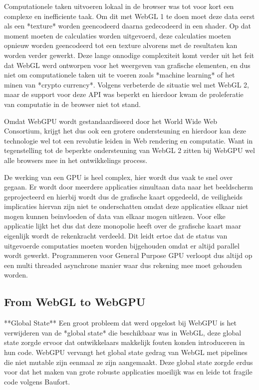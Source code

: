 Computationele taken uitvoeren lokaal in de browser was tot voor kort een complexe en inefficiente taak. Om dit met WebGL 1 te doen moet deze data eerst als een *texture* worden geencodeerd daarna gedecodeerd in een shader. Op dat moment moeten de calculaties worden uitgevoerd, deze calculaties moeten opnieuw worden geencodeerd tot een texture alvorens met de resultaten kan worden verder gewerkt. \textcite{Surma2022} Deze lange onnodige complexiteit komt verder uit het feit dat WebGL werd ontworpen voor het weergeven van grafische elementen, en dus niet om computationele taken uit te voeren zoals *machine learning* of het minen van *crypto currency*. Volgens \textcite{Surma2022} verbeterde de situatie wel met WebGL 2, maar de support voor deze API was beperkt en hierdoor kwam de proleferatie van computatie in de browser niet tot stand.

\bigbreak{}

Omdat WebGPU wordt gestandaardiseerd door het World Wide Web Consortium, krijgt het dus ook een grotere ondersteuning en hierdoor kan deze technologie wel tot een revolutie leiden in Web rendering en computatie. Want in tegenstelling tot de beperkte ondersteuning van WebGL 2 zitten bij WebGPU wel alle browsers mee in het ontwikkelings process. \autocite{Surma2022}

\bigbreak{}

De werking van een GPU is heel complex, hier wordt dus vaak te snel over gegaan. Er wordt door meerdere applicaties simultaan data naar het beeldscherm geprojecteerd en hierbij wordt dus de grafische kaart opgedeeld, de veiligheids implicaties hiervan zijn niet te onderschatten omdat deze applicaties elkaar niet mogen kunnen beinvloeden of data van elkaar mogen uitlezen. Voor elke applicatie lijkt het dus dat deze monopolie heeft over de grafische kaart maar eigenlijk wordt de rekenkracht verdeeld. Dit leidt ertoe dat de status van uitgevoerde computaties moeten worden bijgehouden omdat er altijd parallel wordt gewerkt. Programmeren voor General Purpose GPU verloopt dus altijd op een multi threaded asynchrone manier waar dus rekening mee moet gehouden worden. \autocite{Surma2022}

\subsection{From WebGL to WebGPU}

**Global State**
Een groot probleem dat werd opgelost bij WebGPU is het verwijderen van de *global state* die beschikbaar was in WebGL, deze global state zorgde ervoor dat ontwikkelaars makkelijk fouten konden introduceren in hun code. WebGPU vervangt het global state gedrag van WebGL met pipelines die niet mutable zijn eenmaal ze zijn aangemaakt.
Deze global state zorgde erdus voor dat het maken van grote robuste applicaties moeilijk was en leide tot fragile code volgens Baufort.

